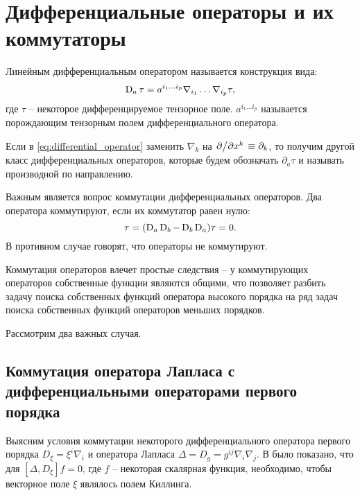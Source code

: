 \documentclass[12pt,a4paper]{article}
\begin{document}

    \section{Дифференциальные операторы и их коммутаторы\label{sec:commutators}}

        Линейным дифференциальным оператором называется конструкция вида:
        \begin{equation}\label{eq:differential_operator}
            \operatorname{D}_a\tau = a^{i_1 \dots i_p} \nabla_{i_1} \dots \nabla_{i_p} \tau ,
        \end{equation}
        где $\tau$ -- некоторое дифференцируемое тензорное поле. $a^{i_1 \dots i_p}$ называется порождающим тензорным полем дифференциального оператора.

        Если в \autoref{eq:differential_operator} заменить $\nabla_k$ на $\pdv*{x^k} \equiv \partial_k$, то получим другой класс дифференциальных операторов, которые будем обозначать $\partial_a\tau$ и называть производной по направлению.

        Важным является вопрос коммутации дифференциальных операторов. Два оператора коммутируют, если их коммутатор равен нулю:
        \begin{equation}
            [\D_a, \D_b]\tau = (\D_a \D_b - \D_b \D_a) \tau = 0 .
        \end{equation}
        В противном случае говорят, что операторы не коммутируют.

        Коммутация операторов влечет простые следствия -- у коммутирующих операторов собственные функции являются общими, что позволяет разбить задачу поиска собственных функций оператора высокого порядка на ряд задач поиска собственных функций операторов меньших порядков.

        Рассмотрим два важных случая.

        \subsection{Коммутация оператора Лапласа с дифференциальными операторами первого порядка}

            Выясним условия коммутации некоторого дифференциального оператора первого порядка $D_\xi = \xi^i \nabla_i$ и оператора Лапласа $\Delta = D_g = g^{ij} \nabla_i \nabla_j$. В \cite{differential_operator_commutators} было показано, что для $[\Delta, D_\xi] f = 0$, где $f$ -- некоторая скалярная функция, необходимо, чтобы векторное поле $\xi$ являлось полем Киллинга.
\end{document}
